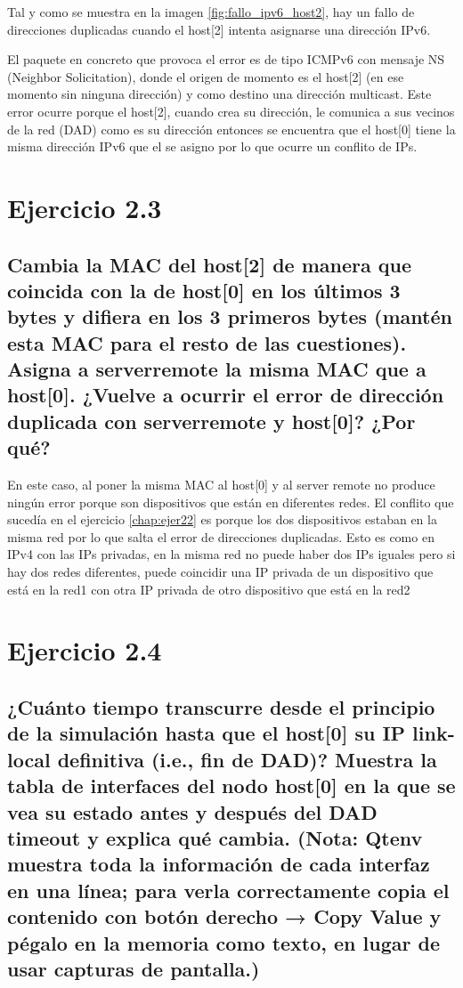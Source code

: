 Tal y como se muestra en la imagen \ref{fig:fallo_ipv6_host2}, hay un fallo de direcciones duplicadas cuando el host[2] intenta asignarse una dirección IPv6. 

El paquete en concreto que provoca el error es de tipo ICMPv6 con mensaje NS (Neighbor Solicitation), donde el origen de momento es el host[2] (en ese momento sin ninguna dirección) y como destino una dirección multicast. Este error ocurre porque el host[2], cuando crea su dirección, le comunica a sus vecinos de la red (DAD) como es su dirección entonces se encuentra que el host[0] tiene la misma dirección IPv6 que el se asigno por lo que ocurre un conflito de IPs.

\section{Ejercicio 2.3}
\subsection{Cambia la MAC del host[2] de manera que coincida con la de host[0] en los últimos 3 bytes y difiera en los 3
primeros bytes (mantén esta MAC para el resto de las cuestiones). Asigna a serverremote la misma MAC que a
host[0]. ¿Vuelve a ocurrir el error de dirección duplicada con serverremote y host[0]? ¿Por qué?}

En este caso, al poner la misma MAC al host[0] y al server remote no produce ningún error porque son dispositivos que están en diferentes redes. 
El conflito que sucedía en el ejercicio \ref{chap:ejer22} es porque los dos dispositivos estaban en la misma red por lo que salta el error de 
direcciones duplicadas. Esto es como en IPv4 con las IPs privadas, en la misma red no puede haber dos IPs iguales pero si hay dos redes diferentes, puede coincidir una IP privada de un dispositivo que está en la red1 con otra IP privada de otro dispositivo que está en la red2

\section{Ejercicio 2.4}
\subsection{¿Cuánto tiempo transcurre desde el principio de la simulación hasta que el host[0] su IP link-local definitiva
(i.e., fin de DAD)? Muestra la tabla de interfaces del nodo host[0] en la que se vea su estado antes y después del
DAD timeout y explica qué cambia. (Nota: Qtenv muestra toda la información de cada interfaz en una línea;
para verla correctamente copia el contenido con botón derecho → Copy Value y pégalo en la memoria como
texto, en lugar de usar capturas de pantalla.)}

